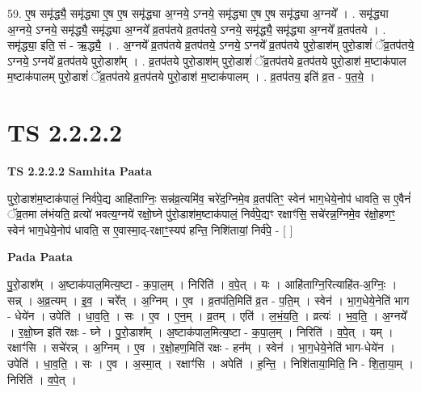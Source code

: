 \documentclass[17pt]{extarticle}
\begin{document}
59. ए॒ष समृ॑द्ध्यै॒ समृ॑द्ध्या ए॒ष ए॒ष समृ॑द्ध्या अ॒ग्नये॒ ऽग्नये॒ समृ॑द्ध्या ए॒ष ए॒ष समृ॑द्ध्या अ॒ग्नये᳚ । . समृ॑द्ध्या अ॒ग्नये॒ ऽग्नये॒ समृ॑द्ध्यै॒ समृ॑द्ध्या अ॒ग्नये᳚ व्र॒तप॑तये व्र॒तप॑तये॒ ऽग्नये॒ समृ॑द्ध्यै॒ समृ॑द्ध्या अ॒ग्नये᳚ व्र॒तप॑तये । . समृ॑द्ध्या॒ इति॒ सं - ऋ॒द्ध्यै॒ । . अ॒ग्नये᳚ व्र॒तप॑तये व्र॒तप॑तये॒ ऽग्नये॒ ऽग्नये᳚ व्र॒तप॑तये पुरो॒डाश॑म् पुरो॒डाशं॑ ॅव्र॒तप॑तये॒ ऽग्नये॒ ऽग्नये᳚ व्र॒तप॑तये पुरो॒डाश᳚म् । . व्र॒तप॑तये पुरो॒डाश॑म् पुरो॒डाशं॑ ॅव्र॒तप॑तये व्र॒तप॑तये पुरो॒डाश॑ म॒ष्टाक॑पाल म॒ष्टाक॑पालम् पुरो॒डाशं॑ ॅव्र॒तप॑तये व्र॒तप॑तये पुरो॒डाश॑ म॒ष्टाक॑पालम् । . व्र॒तप॑तय॒ इति॑ व्र॒त - प॒त॒ये॒ । \newline
\pagebreak
{}

\section{ TS 2.2.2.2 }

\textbf{TS 2.2.2.2 } \newline
\textbf{Samhita Paata} \newline

पुरो॒डाश॑म॒ष्टाक॑पालं॒ निर्व॑पे॒द्य आहि॑ताग्निः॒ सन्न॑व्र॒त्यमि॑व॒ चरे॑द॒ग्निमे॒व व्र॒तप॑तिꣳ॒॒ स्वेन॑ भाग॒धेये॒नोप॑ धावति॒ स ए॒वैनं॑ ॅव्र॒तमा ल॑भंयति॒ व्रत्यो॑ भवत्य॒ग्नये॑ रक्षो॒घ्ने पु॑रो॒डाश॑म॒ष्टाक॑पालं॒ निर्व॑पे॒द्यꣳ रक्षाꣳ॑सि॒ सचे॑रन्न॒ग्निमे॒व र॑क्षो॒हणꣳ॒॒ स्वेन॑ भाग॒धेये॒नोप॑ धावति॒ स ए॒वास्मा॒द्-रक्षाꣳ॒॒स्यप॑ हन्ति॒ निशि॑तायां॒ निर्व॑पे॒ - [  ] \newline

\textbf{Pada Paata} \newline

पु॒रो॒डाश᳚म् । अ॒ष्टाक॑पाल॒मित्य॒ष्टा - क॒पा॒ल॒म् । निरिति॑ । व॒पे॒त् । यः । आहि॑ताग्नि॒रित्याहि॑त-अ॒ग्निः॒ । सन्न् । अ॒व्र॒त्यम् । इ॒व॒ । चरे᳚त् । अ॒ग्निम् । ए॒व । व्र॒तप॑ति॒मिति॑ व्र॒त - प॒ति॒म् । स्वेन॑ । भा॒ग॒धेये॒नेति॑ भाग - धेये॑न । उपेति॑ । धा॒व॒ति॒ । सः । ए॒व । ए॒न॒म् । व्र॒तम् । एति॑ । ल॒भं॒य॒ति॒ । व्रत्यः॑ । भ॒व॒ति॒ । अ॒ग्नये᳚ । र॒क्षो॒घ्न इति॑ रक्षः - घ्ने । पु॒रो॒डाश᳚म् । अ॒ष्टाक॑पाल॒मित्य॒ष्टा - क॒पा॒ल॒म् । निरिति॑ । व॒पे॒त् । यम् । रक्षाꣳ॑सि । सचे॑रन्न् । अ॒ग्निम् । ए॒व । र॒क्षो॒हण॒मिति॑ रक्षः - हन᳚म् । स्वेन॑ । भा॒ग॒धेये॒नेति॑ भाग-धेये॑न । उपेति॑ । धा॒व॒ति॒ । सः । ए॒व । अ॒स्मा॒त् । रक्षाꣳ॑सि । अपेति॑ । ह॒न्ति॒ । निशि॑ताया॒मिति॒ नि - शि॒ता॒या॒म् । निरिति॑ । व॒पे॒त् ।  \newline
\end{document}

